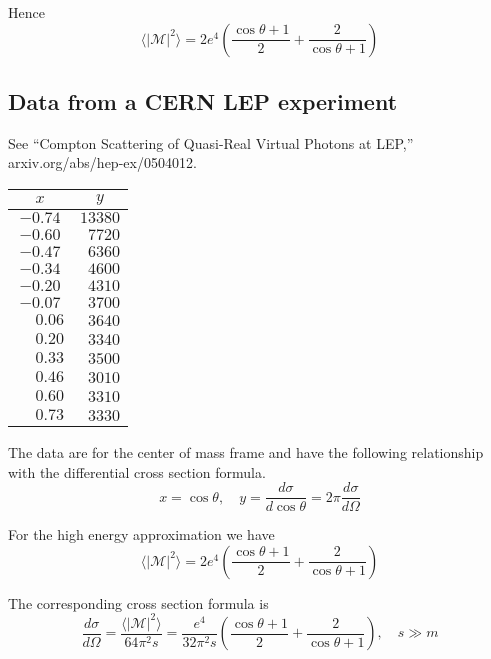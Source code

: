 \documentclass[12pt]{article}
\begin{document}
Hence
\begin{equation*}
\langle|\mathcal{M}|^2\rangle
=2e^4\left(
\frac{\cos\theta+1}{2}+\frac{2}{\cos\theta+1}
\right)
\end{equation*}

\iffalse

\subsection*{Data from a CERN LEP experiment}
See ``Compton Scattering of Quasi-Real Virtual Photons at LEP,''
arxiv.org/abs/hep-ex/0504012.

\begin{center}
\begin{tabular}{|c|c|}
\hline
$x$ & $y$\\
\hline
$-0.74$ & $13380$\\
$-0.60$ & $\phantom{0}7720$\\
$-0.47$ & $\phantom{0}6360$\\
$-0.34$ & $\phantom{0}4600$\\
$-0.20$ & $\phantom{0}4310$\\
$-0.07$ & $\phantom{0}3700$\\
$\phantom{+}0.06$ & $\phantom{0}3640$\\
$\phantom{+}0.20$ & $\phantom{0}3340$\\
$\phantom{+}0.33$ & $\phantom{0}3500$\\
$\phantom{+}0.46$ & $\phantom{0}3010$\\
$\phantom{+}0.60$ & $\phantom{0}3310$\\
$\phantom{+}0.73$ & $\phantom{0}3330$\\
\hline
\end{tabular}
\end{center}

The data are for the center of mass frame and have the following relationship with the differential cross section formula.
\begin{equation*}
x=\cos\theta,
\quad
y=\frac{d\sigma}{d\cos\theta}=2\pi\frac{d\sigma}{d\Omega}
\end{equation*}

For the high energy approximation we have
\begin{equation*}
\langle|\mathcal{M}|^2\rangle
=
2e^4\left(
\frac{\cos\theta+1}{2}+\frac{2}{\cos\theta+1}
\right)
\end{equation*}

The corresponding cross section formula is
\begin{equation*}
\frac{d\sigma}{d\Omega}
=\frac{\langle|\mathcal{M}|^2\rangle}{64\pi^2s}
=\frac{e^4}{32\pi^2s}
\left(
\frac{\cos\theta+1}{2}+\frac{2}{\cos\theta+1}
\right),\quad s\gg m
\end{equation*}
\end{document}
